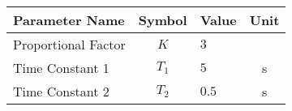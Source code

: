 \begin{tabular}{lclc}
\hline
 Parameter Name      &  Symbol  & Value   &  Unit  \\
\hline
 Proportional Factor &   $K$    & $3$     &        \\
 Time Constant 1     & $T_{1}$  & $5$     &   s    \\
 Time Constant 2     & $T_{2}$  & $0.5$   &   s    \\
\hline
\end{tabular}